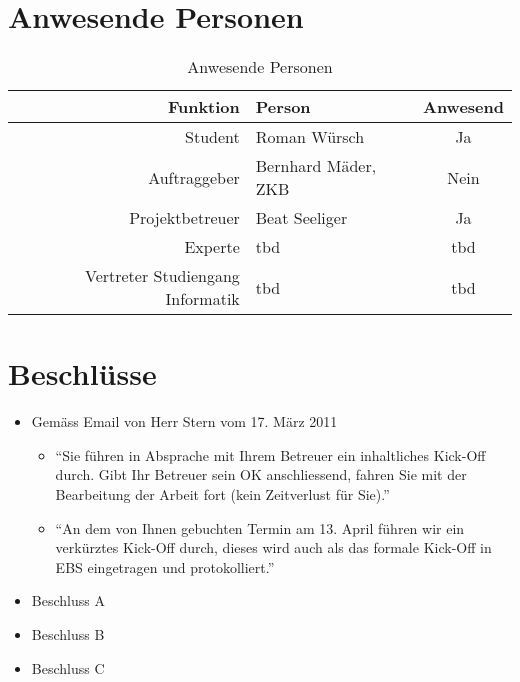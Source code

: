   \section{Anwesende Personen}
    
  \begin{table}[ht]
    \begin{center}
      \begin{tabular}{rlc}
        \toprule
        Funktion & Person & Anwesend\\
        \midrule
        Student & Roman Würsch & Ja\\
        Auftraggeber & Bernhard Mäder, ZKB & Nein\\
        Projektbetreuer & Beat Seeliger & Ja\\
        Experte & tbd & tbd\\
        Vertreter Studiengang Informatik & tbd & tbd\\
        \bottomrule
      \end{tabular}
      \captionsetup{list=no}
      \caption{Anwesende Personen}
      \label{tab:anwesendePersonen}
    \end{center}
  \end{table}

  \section{Beschlüsse}
  \begin{itemize}
      \item Gemäss Email von Herr Stern vom 17. März 2011
      \begin{itemize}
        \item ``Sie führen in Absprache mit Ihrem Betreuer ein inhaltliches
        Kick-Off durch. Gibt Ihr Betreuer sein OK anschliessend, fahren Sie
        mit der Bearbeitung der Arbeit fort (kein Zeitverlust für Sie).''
        \item ``An dem von Ihnen gebuchten Termin am 13. April führen wir
        ein verkürztes Kick-Off durch, dieses wird auch als das formale
        Kick-Off in EBS eingetragen und protokolliert.''
      \end{itemize} 
      \item Beschluss A
      \item Beschluss B
      \item Beschluss C
  \end{itemize}